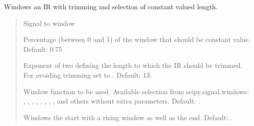 \documentclass[letterpaper,10pt,english]{sphinxmanual}
\begin{document}
\begin{fulllineitems}
\label{\detokenize{modules/dsptoolbox.transfer_functions:dsptoolbox.transfer_functions.window_ir}}
\pysigstartsignatures
{}
\pysigstopsignatures
\sphinxAtStartPar
Windows an IR with trimming and selection of constant valued length.
\begin{quote}\begin{description}
\begin{description}
\sphinxAtStartPar
Signal to window

\sphinxAtStartPar
Percentage (between 0 and 1) of the window that should be
constant value. Default: 0.75

\sphinxAtStartPar
Exponent of two defining the length to which the IR should be
trimmed. For avoiding trimming set to . Default: 13.

\sphinxAtStartPar
Window function to be used. Available selection from
scipy.signal.windows: , , ,
, , , , ,  and
others without extra parameters. Default: .

\sphinxAtStartPar
Windows the start with a rising window as well as the end.
Default: .


\end{description}
\end{description}
\end{quote}
\end{fulllineitems}
\end{document}
